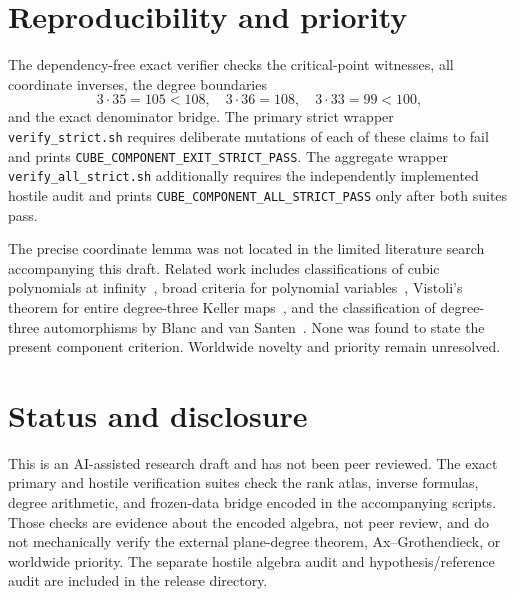 \documentclass[11pt]{article}
\begin{document}
\section{Reproducibility and priority}

The dependency-free exact verifier checks the critical-point witnesses,
all coordinate inverses, the degree boundaries
\[
3\cdot35=105<108,\quad 3\cdot36=108,\quad
3\cdot33=99<100,
\]
and the exact denominator bridge.  The primary strict wrapper
\texttt{verify\_strict.sh} requires deliberate mutations of each of
these claims to fail and prints
\texttt{CUBE\_COMPONENT\_EXIT\_STRICT\_PASS}.  The aggregate wrapper
\texttt{verify\_all\_strict.sh} additionally requires the independently
implemented hostile audit and prints
\texttt{CUBE\_COMPONENT\_ALL\_STRICT\_PASS} only after both suites pass.

The precise coordinate lemma was not located in the limited literature
search accompanying this draft.  Related work includes classifications
of cubic polynomials at infinity~\cite{Ribeiro}, broad criteria for
polynomial variables~\cite{Kaliman}, Vistoli's theorem for entire
degree-three Keller maps~\cite{Vistoli}, and the classification of
degree-three automorphisms by Blanc and van Santen~\cite{BlancVanSanten}.
None was found to state the present component criterion.  Worldwide
novelty and priority remain unresolved.

\section*{Status and disclosure}

This is an AI-assisted research draft and has not been peer reviewed.
The exact primary and hostile verification suites check the rank atlas,
inverse formulas, degree arithmetic, and frozen-data bridge encoded in
the accompanying scripts.  Those checks are evidence about the encoded
algebra, not peer review, and do not mechanically verify the external
plane-degree theorem, Ax--Grothendieck, or worldwide priority.  The
separate hostile algebra audit and hypothesis/reference audit are
included in the release directory.
\end{document}
